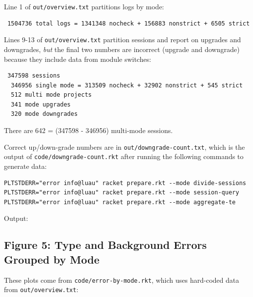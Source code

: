 \documentclass{article}
\begin{document}
Line 1 of \texttt{out/overview.txt} partitions logs by mode:

\begin{verbatim}
 1504736 total logs = 1341348 nocheck + 156883 nonstrict + 6505 strict
\end{verbatim}

Lines 9-13 of \texttt{out/overview.txt} partition sessions and report on upgrades and downgrades,
\emph{but} the final two numbers are incorrect (upgrade and downgrade) because they include
data from module switches:

\begin{verbatim}
 347598 sessions
  346956 single mode = 313509 nocheck + 32902 nonstrict + 545 strict
  512 multi mode projects
  341 mode upgrades
  320 mode downgrades
\end{verbatim}

There are 642 = (347598 - 346956) multi-mode sessions.

Correct up/down-grade numbers are in \texttt{out/downgrade-count.txt},
which is the output of \texttt{code/downgrade-count.rkt} after running
the following commands to generate data:

\begin{verbatim}
PLTSTDERR="error info@luau" racket prepare.rkt --mode divide-sessions
PLTSTDERR="error info@luau" racket prepare.rkt --mode session-query
PLTSTDERR="error info@luau" racket prepare.rkt --mode aggregate-te
\end{verbatim}

Output:




\subsection*{Figure 5: Type and Background Errors Grouped by Mode}

These plots come from \texttt{code/error-by-mode.rkt}, which uses
hard-coded data from \texttt{out/overview.txt}:
\end{document}
